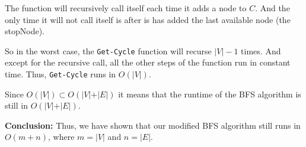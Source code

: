 \documentclass{article}
\begin{document}
The function will recursively call itself each time it adds a node to $C$. And the only time it will not call itself is after is has added the last available node (the stopNode).

So in the worst case, the \texttt{Get-Cycle} function will recurse $\vert V \vert-1$ times.
And except for the recursive call, all the other steps of the function run in constant time. Thus, \texttt{Get-Cycle} runs in $O(\vert V \vert)$.

Since $O(\vert V \vert) \subset O(\vert V\vert + \vert E\vert)$ it means that the runtime of the BFS algorithm is still in $O(\vert V\vert + \vert E\vert)$.

\textbf{Conclusion:}
Thus, we have shown that our modified BFS algorithm still runs in $O( m + n)$, where $m = \vert V \vert$ and $n = \vert E \vert$.

\end{document}
